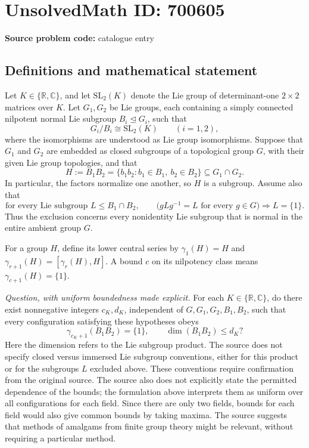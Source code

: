 \documentclass[11pt]{article}
\newcommand{\R}{\mathbb{R}}
\newcommand{\C}{\mathbb{C}}
\begin{document}
\section*{UnsolvedMath ID: 700605}
\textbf{Source problem code:} catalogue entry
\subsection{Definitions and mathematical statement}
Let \(K\in\{\R,\C\}\), and let \(\mathrm{SL}_2(K)\) denote the Lie group of determinant-one \(2\times2\) matrices over \(K\). Let \(G_1,G_2\) be Lie groups, each containing a simply connected nilpotent normal Lie subgroup \(B_i\trianglelefteq G_i\), such that
\[
G_i/B_i\cong\mathrm{SL}_2(K)\qquad(i=1,2),
\]
where the isomorphisms are understood as Lie group isomorphisms. Suppose that \(G_1\) and \(G_2\) are embedded as closed subgroups of a topological group \(G\), with their given Lie group topologies, and that
\[
H:=B_1B_2=\{b_1b_2:b_1\in B_1,\ b_2\in B_2\}\subseteq G_1\cap G_2.
\]
In particular, the factors normalize one another, so \(H\) is a subgroup. Assume also that
\[
\text{for every Lie subgroup }L\leq B_1\cap B_2,\qquad
\bigl(gLg^{-1}=L\text{ for every }g\in G\bigr)\Longrightarrow L=\{1\}.
\]
Thus the exclusion concerns every nonidentity Lie subgroup that is normal in the entire ambient group \(G\).

For a group \(H\), define its lower central series by \(\gamma_1(H)=H\) and \(\gamma_{r+1}(H)=[\gamma_r(H),H]\). A bound \(c\) on its nilpotency class means \(\gamma_{c+1}(H)=\{1\}\).

\emph{Question, with uniform boundedness made explicit.} For each \(K\in\{\R,\C\}\), do there exist nonnegative integers \(c_K,d_K\), independent of \(G,G_1,G_2,B_1,B_2\), such that every configuration satisfying these hypotheses obeys
\[
\gamma_{c_K+1}(B_1B_2)=\{1\},\qquad
\dim(B_1B_2)\leq d_K?
\]
Here the dimension refers to the Lie subgroup product. The source does not specify closed versus immersed Lie subgroup conventions, either for this product or for the subgroups \(L\) excluded above. These conventions require confirmation from the original source. The source also does not explicitly state the permitted dependence of the bounds; the formulation above interprets them as uniform over all configurations for each field. Since there are only two fields, bounds for each field would also give common bounds by taking maxima. The source suggests that methods of amalgams from finite group theory might be relevant, without requiring a particular method.
\end{document}
